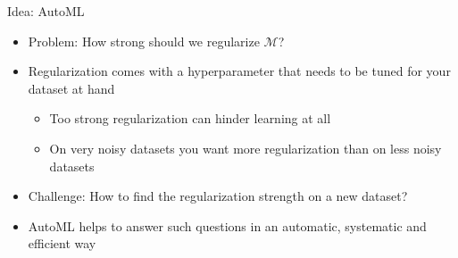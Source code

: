 \documentclass[aspectratio=169]{../latex_main/tntbeamer}  %
\begin{document}
	\begin{frame}[c]{Idea: AutoML}
	    
	    \begin{itemize}
	        \item Problem: How strong should we regularize $\mathcal{M}$?
	        \bigskip
	        \item Regularization comes with a hyperparameter that needs to be tuned for your dataset at hand
	        \begin{itemize}
	            \item Too strong regularization can hinder learning at all
	            \item On very noisy datasets you want more regularization than on less noisy datasets
	        \end{itemize}
	        \item Challenge: How to find the regularization strength on a new dataset?
	        \item AutoML helps to answer such questions in an automatic, systematic and efficient way
	    \end{itemize}
	\end{frame}
	
\end{document}
